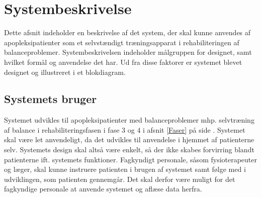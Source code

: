 \section{Systembeskrivelse} 
Dette afsnit indeholder en beskrivelse af det system, der skal kunne anvendes af apopleksipatienter som et selvstændigt træningsapparat i rehabiliteringen af balanceproblemer. Systembeskrivelsen indeholder målgruppen for designet, samt hvilket formål og anvendelse det har. Ud fra disse faktorer er systemet blevet designet og illustreret i et blokdiagram. 

\subsection{Systemets bruger}
Systemet udvikles til apopleksipatienter med balanceproblemer mhp. selvtræning af balance i rehabiliteringsfasen i fase $3$ og $4$ i afsnit \ref{Faser} på side \pageref{Faser}. Systemet skal være let anvendeligt, da det udvikles til anvendelse i hjemmet af patienterne selv. Systemets design skal altså være enkelt, så der ikke skabes forvirring blandt patienterne ift. systemets funktioner. Fagkyndigt personale, såsom fysioterapeuter og læger, skal kunne instruere patienten i brugen af systemet samt følge med i udviklingen, som patienten gennemgår. Det skal derfor være muligt for det fagkyndige personale at anvende systemet og aflæse data herfra. 

